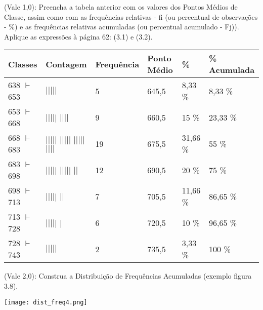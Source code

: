 \documentclass{exam}
\begin{document}
\begin{questions}
\question (Vale 1,0): Preencha a tabela anterior com os valores dos Pontos Médios 
de Classe, assim como com as frequências relativas - fi (ou percentual de 
observações - \%) e as frequências relativas acumuladas (ou percentual acumulado - Fj)).
Aplique as expressões à página 62: (3.1) e (3.2).
        \begin{solution}
            \begin{center}
                \begin{tabular}{|p{2cm}|p{2.5cm}|p{2cm}|p{1cm}|p{1.2cm}|p{2.5cm}|}
                \hline
                Classes & Contagem & Frequência & Ponto Médio & \% & \% Acumulada \\ [1ex] 
                \hline
                638 $\vdash$ 653 & $|||||$ & 5 & 645,5 & 8,33 \% & 8,33 \% \\ 
                \hline
                653 $\vdash$ 668 & $|||||$ $||||$ & 9 & 660,5 & 15 \% & 23,33 \% \\ 
                \hline
                668 $\vdash$ 683 & $|||||$ $|||||$ $|||||$ $||||$ & 19 & 675,5 & 31,66 \% & 55 \% \\ 
                \hline
                683 $\vdash$ 698 & $|||||$ $|||||$ $||$ & 12 & 690,5 & 20 \% & 75 \% \\
                \hline
                698 $\vdash$ 713 & $|||||$ $||$ & 7 & 705,5 & 11,66 \% & 86,65 \% \\
                \hline
                713 $\vdash$ 728 & $|||||$ $|$ & 6 & 720,5 & 10 \% & 96,65 \% \\
                \hline
                728 $\vdash$ 743 & $|||||$ & 2 & 735,5 & 3,33 \% & 100 \% \\
                \hline

            \end{tabular}  
            \end{center}
        \end{solution} 
\vspace{10cm}
\question (Vale 2,0): Construa a Distribuição de Frequências Acumuladas 
(exemplo figura 3.8).
        \begin{center}
        \texttt{[image: dist\_freq4.png]}
        \end{center}
\end{questions}
\end{document}
